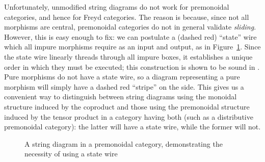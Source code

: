 \documentclass[acmsmall,screen,review]{acmart}
\newcommand{\nats}{\mathbb{N}}
\begin{document}
Unfortunately, unmodified string diagrams do not work for premonoidal categories, and hence for
Freyd categories. The reason is because, since not all morphisms are central, premonoidal categories
do not in general validate \emph{sliding}. However, this is easy enough to fix: we can postulate a
(dashed red) ``state'' wire which all impure morphisms require as an input and output, as in
Figure~\ref{fig:premonoidal-string-diagram}. Since the state wire linearly threads through all
impure boxes, it establishes a unique order in which they must be executed; this construction is
shown to be sound in \citet{promonad}. Pure morphisms do not have a state wire, so a diagram
representing a pure morphism will simply have a dashed red ``stripe'' on the side. This gives us a
convenient way to distinguish between string diagrams using the monoidal structure induced by the
coproduct and those using the premonoidal structure induced by the tensor product in a category
having both (such as a distributive premonoidal category): the latter will have a state wire, while
the former will not.

\begin{figure}
  \caption{
    A string diagram in a premonoidal category, demonstrating the necessity of using a state wire
  }
  \label{fig:premonoidal-string-diagram}
\end{figure}
\end{document}
